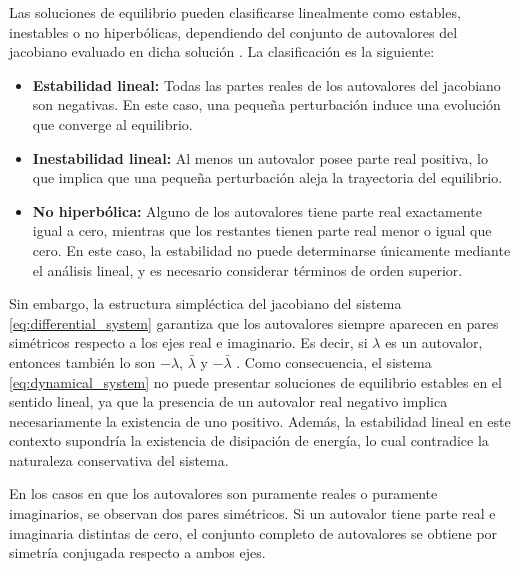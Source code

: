 Las soluciones de equilibrio pueden clasificarse linealmente como estables, inestables o no hiperbólicas,
dependiendo del conjunto de autovalores del jacobiano evaluado en dicha solución .
La clasificación es la siguiente:

\begin{itemize}

    \item \textbf{Estabilidad lineal:} Todas las partes reales de los autovalores del jacobiano son negativas.
          En este caso, una pequeña perturbación induce una evolución que converge al equilibrio.

    \item \textbf{Inestabilidad lineal:} Al menos un autovalor posee parte real positiva, lo que implica que
          una pequeña perturbación aleja la trayectoria del equilibrio.

    \item \textbf{No hiperbólica:} Alguno de los autovalores tiene parte real exactamente igual a cero,
          mientras que los restantes tienen parte real menor o igual que cero. En este caso, la estabilidad
          no puede determinarse únicamente mediante el análisis lineal, y es necesario considerar términos
          de orden superior.

\end{itemize}

Sin embargo, la estructura simpléctica del jacobiano del sistema \eqref{eq:differential_system} garantiza que
los autovalores siempre aparecen en pares simétricos respecto a los ejes real e imaginario. Es decir, si
$\lambda$ es un autovalor, entonces también lo son $-\lambda$, $\bar{\lambda}$ y $-\bar{\lambda}$ \cite{meyer1992introduction}.
Como consecuencia, el sistema \eqref{eq:dynamical_system} no puede presentar soluciones de equilibrio
estables en el sentido lineal, ya que la presencia de un autovalor real negativo implica necesariamente
la existencia de uno positivo. Además, la estabilidad lineal en este contexto supondría la existencia de disipación de energía,
lo cual contradice la naturaleza conservativa del sistema.

En los casos en que los autovalores son puramente reales o puramente imaginarios, se observan dos pares simétricos.
Si un autovalor tiene parte real e imaginaria distintas de cero, el conjunto completo de autovalores se obtiene
por simetría conjugada respecto a ambos ejes.

